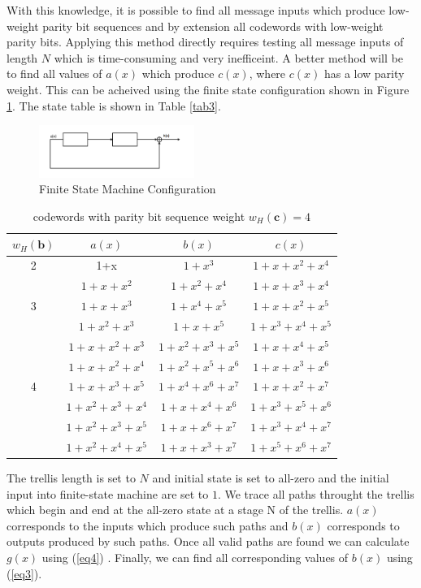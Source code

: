 \documentclass[conference]{IEEEtran}
\begin{document}
 With this knowledge, it is possible to find all message inputs which produce low-weight parity bit sequences and by extension all codewords  with low-weight parity bits. Applying this method directly requires testing all message inputs of length $N$ which is time-consuming and very inefficeint. A better method will be to find all values of $a(x)$ which produce $c(x)$, where $c(x)$ has a low parity weight. This can be acheived using the finite state configuration shown in Figure \ref{fig2}. The state table is shown in Table \ref{tab3}. 
 
\begin{figure}[h]
\centering
		\includegraphics[width=0.45\textwidth]{fsm.png}
		\caption{Finite State Machine Configuration}
		\label{fig2}
		\end{figure}
		
		
		\begin{table}[h!]
 
 \caption{codewords with parity bit sequence weight $w_H(\textbf{c})=4$}
\centering
 \begin{tabular}{c c c c} 
 \hline
 $w_H(\textbf{b})$ & $a(x)$ & $b(x)$ & $c(x)$ \\ [0.5ex] 
 \hline\hline
 2 & 1+x & $1+x^3$ & $1+x+x^2+x^4$\\ 
 \hline 
  & $1+x+x^2$& $1+x^2+x^4$& $1+x+x^3+x^4$ \\
   3 & $1+x+x^3$& $1+x^4+x^5$ & $1+x+x^2+x^5$ \\
  & $1+x^2+x^3$ & $1+x+x^5$ & $1+x^3+x^4+x^5$ \\
  \hline 
  & $1+x+x^2+x^3 $ & $1+x^2+x^3+x^5$ & $1+x+x^4+x^5$ \\
  & $1+x+x^2+x^4 $ & $1+x^2+x^5+x^6$ & $1+x+x^3+x^6$ \\
 4 & $1+x+x^3+x^5 $ & $1+x^4+x^6+x^7$ & $1+x+x^2+x^7$\\ 
  & $1+x^2+x^3+x^4 $ & $1+x+x^4+x^6$ & $1+x^{3}+x^5+x^6$ \\ 
  & $1+x^2+x^3+x^5 $ & $1+x+x^6+x^7$ & $1+x^{3}+x^4+x^7$ \\  
  & $1+x^2+x^4+x^5 $ & $1+x+x^3+x^7$ & $1+x^5+x^6+x^7$ \\ 
 [1ex]
 \hline
 \end{tabular}
 \label{tab2}
\end{table}
		The trellis length is set to $N$ and initial state is set to all-zero and the initial input into finite-state machine are set to $1$.  We trace all paths throught the trellis which begin and end at the all-zero state at a stage N of the trellis. $a(x)$ corresponds to the inputs which produce such paths and $b(x)$ corresponds to outputs produced by such paths. Once all valid paths are found we can calculate $g(x)$ using (\ref{eq4}) . Finally, we can find all corresponding values of $b(x)$ using (\ref{eq3}).
 
\end{document}
